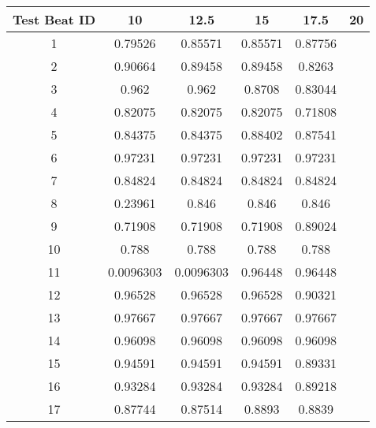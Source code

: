 \begin{tabular}{|c|c|c|c|c|c|}
\hline 
Test Beat ID & 10 & 12.5 & 15 & 17.5 & 20 \\ 
\hline 
1 & 0.79526 & 0.85571 & 0.85571 & 0.87756 &  \\ 
2 & 0.90664 & 0.89458 & 0.89458 & 0.8263 &  \\ 
3 & 0.962 & 0.962 & 0.8708 & 0.83044 &  \\ 
4 & 0.82075 & 0.82075 & 0.82075 & 0.71808 &  \\ 
5 & 0.84375 & 0.84375 & 0.88402 & 0.87541 &  \\ 
6 & 0.97231 & 0.97231 & 0.97231 & 0.97231 &  \\ 
7 & 0.84824 & 0.84824 & 0.84824 & 0.84824 &  \\ 
8 & 0.23961 & 0.846 & 0.846 & 0.846 &  \\ 
9 & 0.71908 & 0.71908 & 0.71908 & 0.89024 &  \\ 
10 & 0.788 & 0.788 & 0.788 & 0.788 &  \\ 
11 & 0.0096303 & 0.0096303 & 0.96448 & 0.96448 &  \\ 
12 & 0.96528 & 0.96528 & 0.96528 & 0.90321 &  \\ 
13 & 0.97667 & 0.97667 & 0.97667 & 0.97667 &  \\ 
14 & 0.96098 & 0.96098 & 0.96098 & 0.96098 &  \\ 
15 & 0.94591 & 0.94591 & 0.94591 & 0.89331 &  \\ 
16 & 0.93284 & 0.93284 & 0.93284 & 0.89218 &  \\ 
17 & 0.87744 & 0.87514 & 0.8893 & 0.8839 &  \\ 
\hline 
\end{tabular}